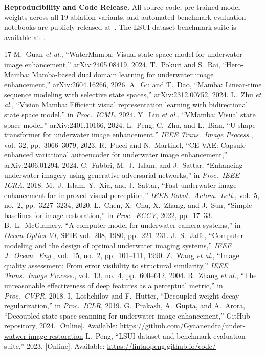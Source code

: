 \documentclass[conference]{IEEEtran}
\begin{document}
	\textbf{Reproducibility and Code Release.}
	All source code, pre-trained model weights across all 19 ablation variants, and automated benchmark evaluation notebooks are publicly released at~\cite{repo}. The LSUI dataset benchmark suite is available at~\cite{lsui}.
	
	\clearpage
	\begin{thebibliography}{17}
		 M.~Guan \emph{et al.}, ``WaterMamba: Visual state space model for underwater image enhancement,'' arXiv:2405.08419, 2024.
		 T.~Pokuri and S.~Rai, ``Hero-Mamba: Mamba-based dual domain learning for underwater image enhancement,'' arXiv:2604.16266, 2026.
		 A.~Gu and T.~Dao, ``Mamba: Linear-time sequence modeling with selective state spaces,'' arXiv:2312.00752, 2024.
		 L.~Zhu \emph{et al.}, ``Vision Mamba: Efficient visual representation learning with bidirectional state space model,'' in \emph{Proc.\ ICML}, 2024.
		 Y.~Liu \emph{et al.}, ``VMamba: Visual state space model,'' arXiv:2401.10166, 2024.
		 L.~Peng, C.~Zhu, and L.~Bian, ``U-shape transformer for underwater image enhancement,'' \emph{IEEE Trans.\ Image Process.}, vol.~32, pp.~3066--3079, 2023.
		 R.~Pucci and N.~Martinel, ``CE-VAE: Capsule enhanced variational autoencoder for underwater image enhancement,'' arXiv:2406.01294, 2024.
		 C.~Fabbri, M.~J.~Islam, and J.~Sattar, ``Enhancing underwater imagery using generative adversarial networks,'' in \emph{Proc.\ IEEE ICRA}, 2018.
		 M.~J.~Islam, Y.~Xia, and J.~Sattar, ``Fast underwater image enhancement for improved visual perception,'' \emph{IEEE Robot.\ Autom.\ Lett.}, vol.~5, no.~2, pp.~3227--3234, 2020.
		 L.~Chen, X.~Chu, X.~Zhang, and J.~Sun, ``Simple baselines for image restoration,'' in \emph{Proc.\ ECCV}, 2022, pp.~17--33.
		 B.~L.~McGlamery, ``A computer model for underwater camera systems,'' in \emph{Ocean Optics VI}, SPIE vol.~208, 1980, pp.~221--231.
		 J.~S.~Jaffe, ``Computer modeling and the design of optimal underwater imaging systems,'' \emph{IEEE J.\ Ocean.\ Eng.}, vol.~15, no.~2, pp.~101--111, 1990.
		 Z.~Wang \emph{et al.}, ``Image quality assessment: From error visibility to structural similarity,'' \emph{IEEE Trans.\ Image Process.}, vol.~13, no.~4, pp.~600--612, 2004.
		 R.~Zhang \emph{et al.}, ``The unreasonable effectiveness of deep features as a perceptual metric,'' in \emph{Proc.\ CVPR}, 2018.
		 I.~Loshchilov and F.~Hutter, ``Decoupled weight decay regularization,'' in \emph{Proc.\ ICLR}, 2019.
		 G.~Prakash, A.~Gupta, and A.~Arora, ``Decoupled state-space scanning for underwater image enhancement,'' GitHub repository, 2024. [Online]. Available: \url{https://github.com/Gyaanendra/under-watwer-image-restoration}
		 L.~Peng, ``LSUI dataset and benchmark evaluation suite,'' 2023. [Online]. Available: \url{https://lintaopeng.github.io/code/}
	\end{thebibliography}
\end{document}
